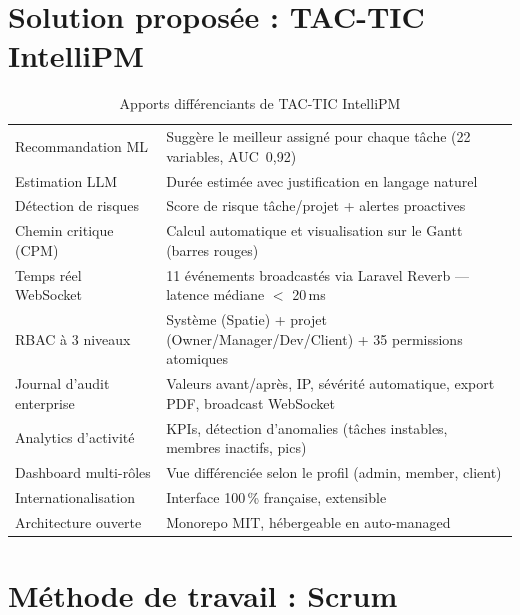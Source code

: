 \section{Solution proposée : TAC-TIC IntelliPM}

\begin{table}[H]
  \centering
  \caption{Apports différenciants de TAC-TIC IntelliPM}
  \label{tab:apports}
  \begin{tabularx}{\textwidth}{L{4.5cm}X}
    \toprule
     &  \\
    \midrule
    Recommandation ML       & Suggère le meilleur assigné pour chaque tâche (22 variables, AUC~0,92) \\
    Estimation LLM          & Durée estimée avec justification en langage naturel \\
    Détection de risques    & Score de risque tâche/projet + alertes proactives \\
    Chemin critique (CPM)   & Calcul automatique et visualisation sur le Gantt (barres rouges) \\
    Temps réel WebSocket    & 11 événements broadcastés via Laravel Reverb — latence médiane $<$ 20\,ms \\
    RBAC à 3 niveaux        & Système (Spatie) + projet (Owner/Manager/Dev/Client) + 35 permissions atomiques \\
    Journal d'audit enterprise & Valeurs avant/après, IP, sévérité automatique, export PDF, broadcast WebSocket \\
    Analytics d'activité    & KPIs, détection d'anomalies (tâches instables, membres inactifs, pics) \\
    Dashboard multi-rôles   & Vue différenciée selon le profil (admin, member, client) \\
    Internationalisation    & Interface 100\,\% française, extensible \\
    Architecture ouverte    & Monorepo MIT, hébergeable en auto-managed \\
    \bottomrule
  \end{tabularx}
\end{table}

\section{Méthode de travail : Scrum}

